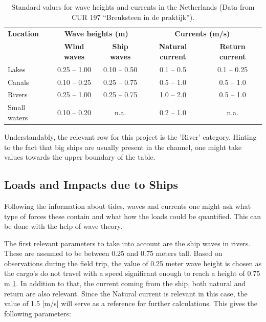 \begin{table}[H]
    \centering
    \caption{Standard values for wave heights and currents in the Netherlands (Data from CUR 197 ``Breuksteen in de praktijk'').}
    \label{tab:standard_values}
    \begin{tabular}{lcccc}
        \toprule
        \textbf{Location} & \multicolumn{2}{c}{\textbf{Wave heights (m)}} & \multicolumn{2}{c}{\textbf{Currents (m/s)}} \\
        \cmidrule(lr){2-3} \cmidrule(l){4-5}
        & \textbf{Wind waves} & \textbf{Ship waves} & \textbf{Natural current} & \textbf{Return current} \\
        \midrule
        Lakes          & 0.25 -- 1.00  & 0.10 -- 0.50  & 0.1 -- 0.5  & 0.1 -- 0.25 \\
        Canals         & 0.10 -- 0.25  & 0.25 -- 0.75  & 0.5 -- 1.0  & 0.5 -- 1.0  \\
        Rivers         & 0.25 -- 1.00  & 0.25 -- 0.75  & 1.0 -- 2.0  & 0.5 -- 1.0  \\
        Small waters   & 0.10 -- 0.20  & n.a.          & 0.2 -- 1.0  & n.a.       \\
        \bottomrule
    \end{tabular}
\end{table}


Understandably, the relevant row for this project is the 'River' category. Hinting to the fact that big ships are usually present in the channel, one might take values towards the upper boundary of the table.

\subsection{Loads and Impacts due to Ships}
Following the information about tides, waves and currents one might ask what type of forces these contain and what how the loads could be quantified. This can be done with the help of wave theory. 

The first relevant parameters to take into account are the ship waves in rivers. These are assumed to be between 0.25 and 0.75 meters tall. Based on observations during the field trip, the value of 0.25 meter wave height is chosen as the cargo's do not travel with a speed significant enough to reach a height of 0.75 m \ref{tab:standard_values}. 
In addition to that, the current coming from the ship, both natural and return are also relevant. Since the Natural current is relevant in this case, the value of 1.5 [m/s] will serve as a reference for further calculations.
This gives the following parameters:

